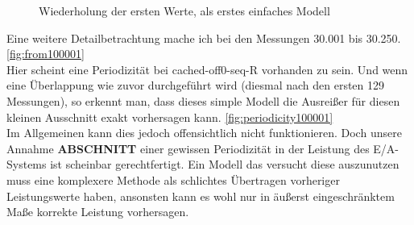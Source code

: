 \documentclass[
	12pt,
	a4paper,
	BCOR10mm,
	DIV14,
	listof=totoc,
	bibliography=totoc,
	headsepline
]{scrreprt}
\begin{document}
\begin{figure}
	\caption{Wiederholung der ersten Werte, als erstes einfaches Modell}
	\label{fig:periodicity}
\end{figure} 

Eine weitere Detailbetrachtung mache ich bei den Messungen 30.001 bis 30.250. \ref{fig:from100001}\\
Hier scheint eine Periodizität bei cached-off0-seq-R vorhanden zu sein. Und wenn eine Überlappung wie zuvor durchgeführt wird (diesmal nach den ersten 129 Messungen), so erkennt man, dass dieses simple Modell die Ausreißer für diesen kleinen Ausschnitt exakt vorhersagen kann. \ref{fig:periodicity100001}\\
Im Allgemeinen kann dies jedoch offensichtlich nicht funktionieren. Doch unsere Annahme \textbf{ABSCHNITT} einer gewissen Periodizität in der Leistung des E/A-Systems ist scheinbar gerechtfertigt. Ein Modell das versucht diese auszunutzen muss eine komplexere Methode als schlichtes Übertragen vorheriger Leistungswerte haben, ansonsten kann es wohl nur in äußerst eingeschränktem Maße korrekte Leistung vorhersagen.
\end{document}
